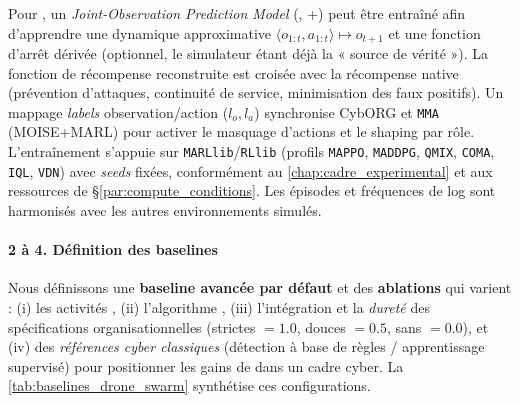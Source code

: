 Pour \texttt{}, un \textit{Joint-Observation Prediction Model} (, +) peut être entraîné afin d’apprendre une dynamique approximative $\langle o_{1:t}, a_{1:t} \rangle \mapsto o_{t+1}$ et une fonction d’arrêt dérivée (optionnel, le simulateur étant déjà la « source de vérité »). La fonction de récompense reconstruite est croisée avec la récompense native (prévention d’attaques, continuité de service, minimisation des faux positifs). Un mappage \emph{labels} observation/action ($l_o, l_a$) synchronise CybORG et \texttt{MMA} (MOISE+MARL) pour activer le masquage d’actions et le shaping par rôle. L’entraînement s’appuie sur \texttt{MARLlib}/\texttt{RLlib} (profils \texttt{MAPPO}, \texttt{MADDPG}, \texttt{QMIX}, \texttt{COMA}, \texttt{IQL}, \texttt{VDN}) avec \textit{seeds} fixées, conformément au \autoref{chap:cadre_experimental} et aux ressources de \S\ref{par:compute_conditions}. Les épisodes et fréquences de log sont harmonisés avec les autres environnements simulés.

\paragraph{2 à 4. Définition des baselines}

Nous définissons une \textbf{baseline avancée par défaut} et des \textbf{ablations} qui varient : (i) les activités , (ii) l’algorithme , (iii) l’intégration et la \textit{dureté} des spécifications organisationnelles (strictes $=1.0$, douces $=0.5$, sans $=0.0$), et (iv) des \textit{références cyber classiques} (détection à base de règles / apprentissage supervisé) pour positionner les gains de  dans un cadre cyber. La \autoref{tab:baselines_drone_swarm} synthétise ces configurations.


